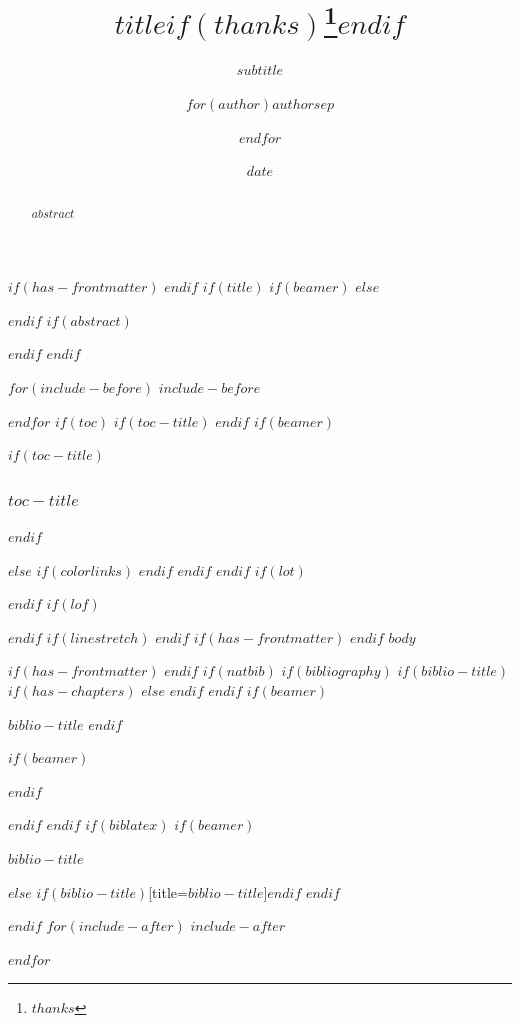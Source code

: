 \documentclass[
$if(fontsize)$
  $fontsize$,
$endif$
$if(lang)$
  $babel-lang$,
$endif$
$if(papersize)$
  $papersize$paper,
$endif$
$if(beamer)$
  ignorenonframetext,
$if(handout)$
  handout,
$endif$
$if(aspectratio)$
  aspectratio=$aspectratio$,
$endif$
$endif$
$for(classoption)$
  $classoption$$sep$,
$endfor$
]{$documentclass$}
\title{$title$$if(thanks)$\thanks{$thanks$}$endif$}
\subtitle{$subtitle$}
\author{$for(author)$$author$$sep$ \and $endfor$}
\date{$date$}
\institute{$for(institute)$$institute$$sep$ \and $endfor$}
\newif\ifbibliography
\begin{document}
$if(has-frontmatter)$
\frontmatter
$endif$
$if(title)$
$if(beamer)$
\frame{\titlepage}
$else$
\maketitle
$endif$
$if(abstract)$
\begin{abstract}
$abstract$
\end{abstract}
$endif$
$endif$

$for(include-before)$
$include-before$

$endfor$
$if(toc)$
$if(toc-title)$
\renewcommand*\contentsname{$toc-title$}
$endif$
$if(beamer)$
\begin{frame}[allowframebreaks]
$if(toc-title)$
  \frametitle{$toc-title$}
$endif$
  \tableofcontents[hideallsubsections]
\end{frame}
$else$
{
$if(colorlinks)$
\hypersetup{linkcolor=$if(toccolor)$$toccolor$$else$$endif$}
$endif$
\setcounter{tocdepth}{$toc-depth$}
\tableofcontents
}
$endif$
$endif$
$if(lot)$
\listoftables
$endif$
$if(lof)$
\listoffigures
$endif$
$if(linestretch)$
$endif$
$if(has-frontmatter)$
\mainmatter
$endif$
$body$

$if(has-frontmatter)$
\backmatter
$endif$
$if(natbib)$
$if(bibliography)$
$if(biblio-title)$
$if(has-chapters)$
\renewcommand\bibname{$biblio-title$}
$else$
\renewcommand\refname{$biblio-title$}
$endif$
$endif$
$if(beamer)$
\begin{frame}[allowframebreaks]{$biblio-title$}
  \bibliographytrue
$endif$
  
$if(beamer)$
\end{frame}
$endif$

$endif$
$endif$
$if(biblatex)$
$if(beamer)$
\begin{frame}[allowframebreaks]{$biblio-title$}
  \bibliographytrue
  \printbibliography[heading=none]
\end{frame}
$else$
\printbibliography$if(biblio-title)$[title=$biblio-title$]$endif$
$endif$

$endif$
$for(include-after)$
$include-after$

$endfor$
\end{document}
